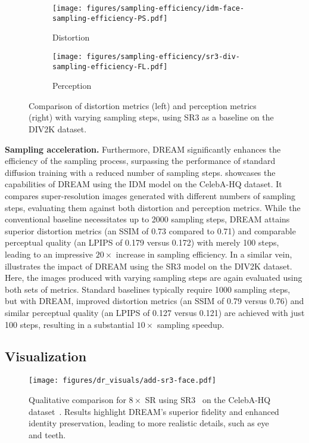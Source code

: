 \begin{figure}[t]
     \centering
     \begin{subfigure}[b]{0.23\textwidth}
         \centering
         \texttt{[image: figures/sampling-efficiency/idm-face-sampling-efficiency-PS.pdf]}
         \caption{Distortion}
         \label{fig:sr3-div-sampling-ps}
     \end{subfigure}
     \begin{subfigure}[b]{0.242\textwidth}
         \centering
         \texttt{[image: figures/sampling-efficiency/sr3-div-sampling-efficiency-FL.pdf]}
         \caption{Perception}
         \label{fig:sr3-div-sampling-fl}
     \end{subfigure}
     \vspace{-.28in}
         \caption{Comparison of distortion metrics (left) and perception metrics (right) with varying sampling steps, using  SR3 as a baseline on the DIV2K dataset.}
        \label{fig:sr3-div-sampling}
        \vspace{-.2in}
\end{figure}
\noindent\textbf{Sampling acceleration.} Furthermore, DREAM significantly enhances the efficiency of the sampling process, surpassing the performance of standard diffusion training with a reduced number of sampling steps.  showcases the capabilities of DREAM using the IDM model on the CelebA-HQ dataset. It compares super-resolution images generated with different numbers of sampling steps, evaluating them against both distortion and perception metrics. While the conventional baseline necessitates up to 2000 sampling steps, DREAM attains superior distortion metrics (an SSIM of 0.73 compared to 0.71) and comparable perceptual quality (an LPIPS of 0.179 versus 0.172) with merely 100 steps, leading to an impressive $20\times$ increase in sampling efficiency. In a similar vein,  illustrates the impact of DREAM using the SR3 model on the DIV2K dataset. Here, the images produced with varying sampling steps are again evaluated using both sets of metrics. Standard baselines typically require 1000 sampling steps, but with DREAM, improved distortion metrics (an SSIM of 0.79 versus 0.76) and similar perceptual quality (an LPIPS of 0.127 versus 0.121) are achieved with just 100 steps, resulting in a substantial $10\times$ sampling speedup.

\subsection{Visualization}\label{sec:app-vis}
\begin{figure}[t]
    \centering
    \texttt{[image: figures/dr\_visuals/add-sr3-face.pdf]}
    \vspace{-.1in}
    \caption{
    Qualitative comparison for $8\times$ SR using SR3~\cite{saharia2022image} on the CelebA-HQ dataset~\cite{karras2017progressive}. Results highlight DREAM's superior fidelity and enhanced identity preservation, leading to more realistic details, such as eye and teeth.} 
        \label{fig:app-face-sr3}
    \vspace{-.1in}
\end{figure}

